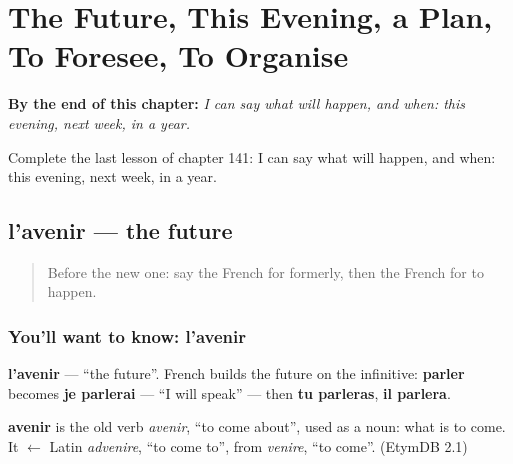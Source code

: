 
\chapter{The Future, This Evening, a Plan, To Foresee, To Organise}
\label{ch:fr-the-future-this-evening-a-plan-to-foresee-to-organise}

\begin{chapteropening}
\textbf{By the end of this chapter:} \emph{I can say what will happen, and when: this evening, next week, in a year.}

Complete the last lesson of chapter 141: I can say what will happen, and when: this evening, next week, in a year.
\end{chapteropening}

\section[l'avenir]{l'avenir — the future}

\label{lesson:FR-C141-lavenir}



\begin{quote}
Before the new one: say the French for formerly, then the French for to happen.
\end{quote}

\subsection*{You'll want to know: l'avenir}
\textbf{l'avenir} — \textquotedblleft{}the future\textquotedblright{}. French builds the future on the infinitive: \textbf{parler} becomes \textbf{je parlerai} — \textquotedblleft{}I will speak\textquotedblright{} — then \textbf{tu parleras}, \textbf{il parlera}.

\begin{cousinweb}
\textbf{avenir} is the old verb \emph{avenir}, \textquotedblleft{}to come about\textquotedblright{}, used as a noun: what is to come. It $\leftarrow$ Latin \emph{advenire}, \textquotedblleft{}to come to\textquotedblright{}, from \emph{venire}, \textquotedblleft{}to come\textquotedblright{}. (EtymDB 2.1)
\end{cousinweb}

